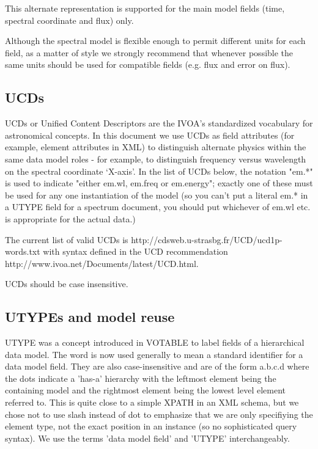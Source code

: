 \documentclass[11pt]{article}
\begin{document}
This alternate representation is supported for the
main model fields (time, spectral coordinate and flux) only.



Although the spectral model is flexible enough to permit different units
for each field, as a matter of style we strongly recommend that whenever
possible the
same units should be used for compatible fields (e.g. flux and error on flux).

\subsection{UCDs}

UCDs or Unified Content Descriptors are the IVOA's standardized vocabulary
for astronomical concepts. In this document we use UCDs as field attributes
(for example, element attributes in XML) to distinguish alternate 
physics within the same data model roles - for example, to distinguish
frequency versus wavelength on the spectral coordinate `X-axis'.
In the list of UCDs below, the notation "em.*" is used to indicate "either
em.wl, em.freq or em.energy"; exactly one of these must be used for
any one instantiation of the model (so you can't put a literal em.* in
a UTYPE field for a spectrum document, you should put whichever of
em.wl etc. is appropriate for the actual data.)

The current list of valid UCDs is
http://cdsweb.u-strasbg.fr/UCD/ucd1p-words.txt
with syntax defined in the UCD recommendation
http://www.ivoa.net/Documents/latest/UCD.html.

UCDs should be case insensitive.


\subsection{UTYPEs and model reuse}

UTYPE was a concept introduced in VOTABLE to label fields of a hierarchical
data model. The word is now used generally to mean a standard identifier
for a data model field. They are also case-insensitive and are of the
form a.b.c.d  where the dots indicate a 'has-a' hierarchy
with the leftmost element being the containing model and the rightmost
element being the lowest level element referred to. This is quite close
to a simple XPATH in an XML schema, but we chose not to use slash instead of
dot to emphasize that we are only specifiying the element type, not the
exact position in an instance (so no sophisticated query syntax).
We use the terms 'data model field' and 'UTYPE' interchangeably.
\end{document}
